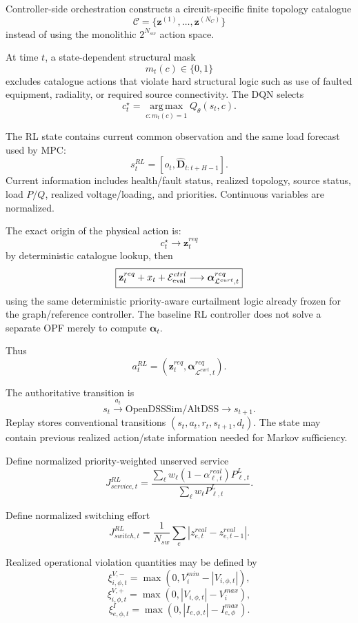 \documentclass[11pt]{article}
\newcommand{\argmax}{\operatorname*{arg\,max}}
\begin{document}
Controller-side orchestration constructs a circuit-specific finite topology catalogue
\[
\boxed{
\mathcal C=\{\mathbf z^{(1)},\dots,\mathbf z^{(N_C)}\}}
\]
instead of using the monolithic $2^{N_{sw}}$ action space.

At time $t$, a state-dependent structural mask
\[
\boxed{m_t(c)\in\{0,1\}}
\]
excludes catalogue actions that violate hard structural logic such as use of faulted
equipment, radiality, or required source connectivity. The DQN selects
\[
\boxed{
c_t^\star=
\argmax_{c:m_t(c)=1}Q_\theta(s_t,c).}
\]

The RL state contains current common observation and the same load forecast used by MPC:
\[
\boxed{s_t^{RL}=[o_t,\hat{\mathbf D}_{t:t+H-1}].}
\]
Current information includes health/fault status, realized topology, source status,
load $P/Q$, realized voltage/loading, and priorities. Continuous variables are normalized.

The exact origin of the physical action is:
\[
\boxed{
c_t^\star\longrightarrow\mathbf z_t^{req}}
\]
by deterministic catalogue lookup, then
\[
\boxed{
\mathbf z_t^{req}+x_t+\mathcal E_{\rm eval}^{ctrl}
\longrightarrow
\boldsymbol\alpha_{\mathcal L^{curt},t}^{req}}
\]
using the same deterministic priority-aware curtailment logic already frozen for the
graph/reference controller. The baseline RL controller does not solve a separate OPF
merely to compute $\boldsymbol\alpha_t$.

Thus
\[
\boxed{
a_t^{RL}
=
(\mathbf z_t^{req},\boldsymbol\alpha_{\mathcal L^{curt},t}^{req}).}
\]

The authoritative transition is
\[
s_t\xrightarrow{a_t}\text{OpenDSSSim/AltDSS}\rightarrow s_{t+1}.
\]
Replay stores conventional transitions $(s_t,a_t,r_t,s_{t+1},d_t)$. The state may
contain previous realized action/state information needed for Markov sufficiency.

Define normalized priority-weighted unserved service
\[
\boxed{
J_{service,t}^{RL}
=
\frac{\sum_\ell w_\ell(1-\alpha_{\ell,t}^{real})P_{\ell,t}^{L}}
{\sum_\ell w_\ell P_{\ell,t}^{L}}.}
\]

Define normalized switching effort
\[
\boxed{
J_{switch,t}^{RL}
=
\frac{1}{N_{sw}}
\sum_e|z_{e,t}^{real}-z_{e,t-1}^{real}|.}
\]

Realized operational violation quantities may be defined by
\[
\xi_{i,\phi,t}^{V,-}=\max(0,V_i^{min}-|V_{i,\phi,t}|),
\]
\[
\xi_{i,\phi,t}^{V,+}=\max(0,|V_{i,\phi,t}|-V_i^{max}),
\]
\[
\xi_{e,\phi,t}^{I}=\max(0,|I_{e,\phi,t}|-I_{e,\phi}^{max}).
\]
\end{document}

